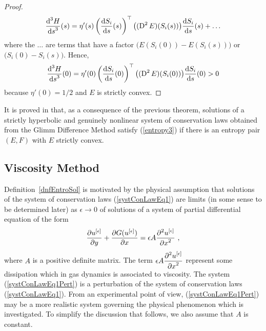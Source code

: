 \begin{proof}
\[
\frac{\displaystyle \mathrm{d}^{3}{H}} {\displaystyle \mathrm{d}{s}^{3}}(s) = \eta'(s)
\left(\frac{\mathrm{d}S_i}{\mathrm{d}{s}}(s)\right)^\top \big((\operatorname{D}^2 E)(S_i(s))\big)
\frac{\mathrm{d}S_i}{\mathrm{d}{s}}(s) + \ldots
\]
where the $\ldots$ are terms that have a factor
$\big( E(S_i(0)) - E(S_i(s)) \big)$ or
$\big( S_i(0) - S_i(s) \big)$.  Hence,
\[
\frac{\displaystyle \mathrm{d}^{3}{H}} {\displaystyle \mathrm{d}{s}^{3}}(0) = \eta'(0)
\left(\frac{\mathrm{d}S_i}{\mathrm{d}{s}}(0)\right)^\top \big((\operatorname{D}^2 E)(S_i(0))\big)
\frac{\mathrm{d}S_i}{\mathrm{d}{s}}(0) > 0
\]
because $\eta'(0) = 1/2$ and $E$ is strictly convex.
\end{proof}

It is proved in \cite{Smo} that, as a consequence of the previous
theorem, solutions of a strictly hyperbolic and genuinely nonlinear
system of conservation laws obtained from the Glimm Difference Method
satisfy (\ref{entropy3}) if there is an entropy pair $(E,F)$ with
$E$ strictly convex.

\subsection{Viscosity Method}

Definition~\ref{dnfEntroSol} is motivated by the physical assumption
that solutions of the system of conservation laws
(\ref{systConLawEq1}) are limits (in some sense to be determined
later) as $\epsilon \to 0$ of solutions
of a system of partial differential equation of the form
\begin{equation} \label{systConLawEq1Pert}
\frac{\partial{u^{[\epsilon]}}}{\partial y} + \frac{\partial{G(u^{[\epsilon]})}}{\partial x}
= \epsilon A \frac{\displaystyle \partial^{2}{u^{[\epsilon]}}} {\displaystyle \partial x^{2}} \ ,
\end{equation}
where $A$ is a positive definite \nn matrix.
The term $\displaystyle \epsilon A \frac{\displaystyle \partial^{2}{u^{[\epsilon]}}} {\displaystyle \partial x^{2}}$
represent some dissipation which in gas dynamics is associated to
viscosity.  The system (\ref{systConLawEq1Pert}) is a
perturbation of the system of conservation laws (\ref{systConLawEq1}).
From an experimental point of view, (\ref{systConLawEq1Pert}) may be a
more realistic system governing the physical phenomenon which is
investigated.  To simplify the discussion that follows, we also assume
that $A$ is constant.

